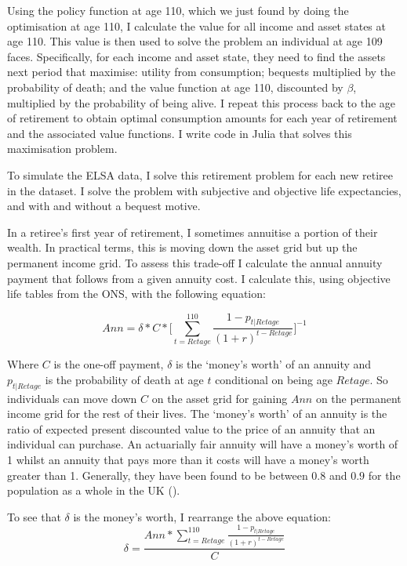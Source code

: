 \documentclass[12pt]{article}
\begin{document}
Using the policy function at age 110, which we just found by doing the
optimisation at age 110, I calculate the value for all income and asset states
at age 110. This value is then used to solve the problem an individual at age
109 faces. Specifically, for each income and asset state, they need to find the
assets next period that maximise: utility from consumption; bequests multiplied
by the probability of death; and the value function at age 110, discounted by
$\beta$, multiplied by the probability of being alive. I repeat this process
back to the age of retirement to obtain optimal consumption amounts for each
year of retirement and the associated value functions. I write code in Julia
that solves this maximisation problem.

To simulate the ELSA data, I solve this retirement problem for each new retiree
in the dataset. I solve the problem with subjective and objective life
expectancies, and with and without a bequest motive.

In a retiree's first year of retirement, I sometimes annuitise a portion of
their wealth. In practical terms, this is moving down the asset grid but up the
permanent income grid. To assess this trade-off I calculate the annual annuity
payment that follows from a given annuity cost. I calculate this, using
objective life tables from the ONS, with the following equation:


\begin{equation*}
  Ann = \delta * C * \biggl[\sum_{t = Retage}^{110}\frac{1 - p_{t|Retage}}{(1 + r)^{t - Retage}}\biggr]^{-1}
\end{equation*}

Where $C$ is the one-off payment, $\delta$ is the `money's worth' of an annuity
and $p_{t|Retage}$ is the probability of death at age $t$ conditional on being
age $Retage$. So individuals can move down $C$ on the asset grid for gaining
$Ann$ on the permanent income grid for the rest of their lives. The `money's
worth' of an annuity is the ratio of expected present discounted value to the
price of an annuity that an individual can purchase. An actuarially fair annuity
will have a money's worth of 1 whilst an annuity that pays more than it costs
will have a money's worth greater than 1. Generally, they have been found to be
between $0.8$ and $0.9$ for the population as a whole in the UK
(\cite{finkelstein-porteba-2002, finkelstein-porteba-2004, mitchell-et-al-1999}).

To see that $\delta$ is the money's worth, I rearrange the above equation:
\begin{equation*}
  \delta =  \frac{Ann*\sum_{t = Retage}^{110}\frac{1 - p_{t|Retage}}{(1 + r)^{t - Retage}}}{C}
\end{equation*}
\end{document}
